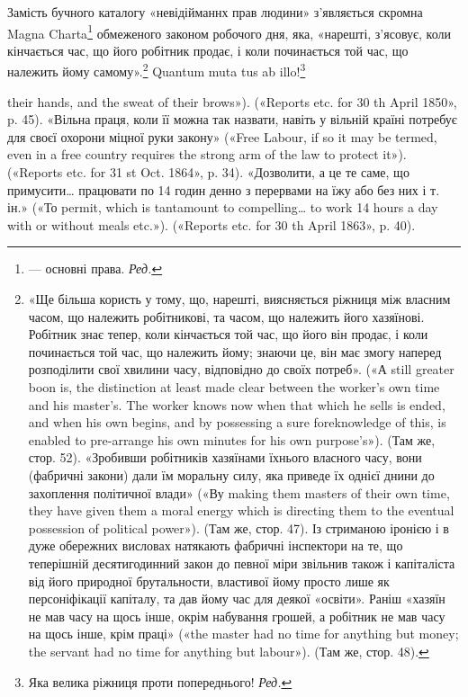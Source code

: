 Замість бучного каталогу «невідійманнх прав людини» з’являється
скромна Magna Charta\footnote*{
— основні права. \emph{Ред.}
} обмеженого законом робочого
дня, яка, «нарешті, з’ясовує, коли кінчається час, що його робітник
продає, і коли починається той час, що належить йому самому».\footnote{
«Ще більша користь у тому, що, нарешті, виясняється ріжниця
між власним часом, що належить робітникові, та часом, що належить
його хазяїнові. Робітник знає тепер, коли кінчається той час, що його
він продає, і коли починається той час, що належить йому; знаючи це,
він має змогу наперед розподілити свої хвилини часу, відповідно до своїх
потреб». («А still greater boon is, the distinction at least made clear between
the worker’s own time and his master’s. The worker knows now when
that which he sells is ended, and when his own begins, and by possessing a sure
foreknowledge of this, is enabled to pre-arrange his own minutes for his
own purpose’s»). (Там же, стор. 52). «Зробивши робітників хазяїнами
їхнього власного часу, вони (фабричні закони) дали їм моральну силу,
яка приведе їх однієї днини до захоплення політичної влади» («Ву
making them masters of their own time, they have given them a moral energy
which is directing them to the eventual possession of political power»).
(Там же, стор. 47). Із стриманою іронією і в дуже обережних висловах
натякають фабричні інспектори на те, що теперішній десятигодинний
закон до певної міри звільнив також і капіталіста від його природної
брутальности, властивої йому просто лише як персоніфікації капіталу, та
дав йому час для деякої «освіти». Раніш «хазяїн не мав часу на щось
інше, окрім набування грошей, а робітник не мав часу на щось інше,
крім праці» («the master had no time for anything but money; the servant
had no time for anything but labour»). (Там же, стор. 48).
}
Quantum muta tus ab illo!\footnote*{
Яка велика ріжниця проти попереднього! \emph{Ред.}
}

their hands, and the sweat of their brows»). («Reports etc. for 30 th April
1850», p. 45). «Вільна праця, коли її можна так назвати, навіть у вільній
країні потребує для своєї охорони міцної руки закону» («Free Labour,
if so it may be termed, even in a free country requires the strong arm of
the law to protect it»). («Reports etc. for 31 st Oct. 1864», p. 34). «Дозволити,
а це те саме, що примусити\dots{} працювати по 14 годин денно з перервами
на їжу або без них і т. ін.» («То permit, which is tantamount to
compelling\dots{} to work 14 hours a day with or without meals etc.»). («Reports
etc. for 30 th April 1863», p. 40).
